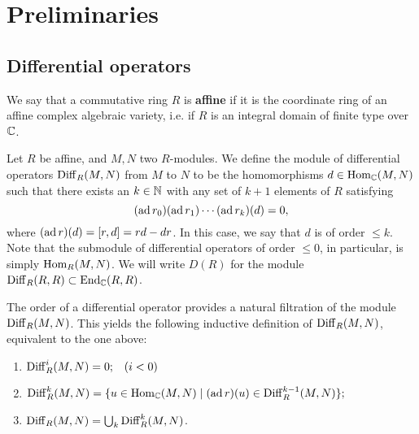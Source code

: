 \chapter{Preliminaries}


\section{Differential operators}

\begin{definition}
    We say that a commutative ring $R$ is \textbf{affine} if it is
    the coordinate ring of an affine complex algebraic variety, i.e.
    if $R$ is an integral domain of finite type over $\mathbb{C}$.
\end{definition}

\begin{definition}
    Let $R$ be affine, and $M,N$ two $R$-modules.
    We define the module of
    differential operators $\operatorname{Diff}_R(M,N)$ from $M$ to $N$ to be the homomorphisms $d\in\operatorname{Hom}_{\mathbb{C}}(M,N)$
    such that there exists an $k\in\mathbb{N}$ with any set of $k+1$ elements of $R$ satisfying
    \begin{equation}
        (\operatorname{ad} r_0)(\operatorname{ad} r_1)\cdots(\operatorname{ad} r_k)(d)=0,
        \label{eq:ad}
    \end{equation}
    where $(\operatorname{ad} r)(d)=[r,d]=rd-dr$. In this case, we say that $d$ is of order $\leqslant k$.
    Note that the submodule of differential operators of order $\leqslant 0$, in particular,
    is simply $\operatorname{Hom}_R(M,N)$. We will write $D(R)$ for the module $\operatorname{Diff}_R(R,R)\subset\operatorname{End}_{\mathbb{C}}(R,R)$.
    \label{def:derivations}
\end{definition}

\begin{remark}
    The order of a differential operator provides a natural filtration of the module $\operatorname{Diff}_R(M,N)$.
    This yields the following inductive definition of $\operatorname{Diff}_R(M,N)$, equivalent to the one
    above: %
    \begin{enumerate}
        \item[] $\operatorname{Diff}^{i}_R(M,N) = 0; \;\;\;(i<0)$
        \item[] $\operatorname{Diff}^k_R(M,N) = \{u\in\operatorname{Hom}_{\mathbb{C}}(M,N)\mid (\operatorname{ad} r)(u)\in \operatorname{Diff}^{k-1}_R(M,N)\};$
        \item[] $\operatorname{Diff}_R(M,N)=\bigcup_k\operatorname{Diff}^k_R(M,N)$.
    \end{enumerate}
\end{remark}

